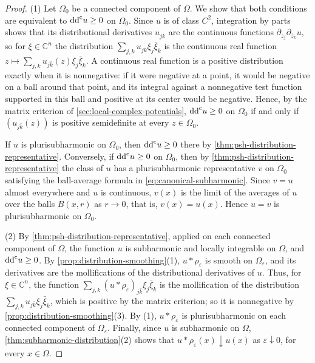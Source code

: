 \begin{proof}
(1) Let $\Omega_0$ be a connected component of $\Omega$. We show that both conditions are equivalent to $\mathrm{dd}^{\mathrm{c}} u\geq0$ on $\Omega_0$. Since $u$ is of class $C^2$, integration by parts shows that its distributional derivatives $u_{j\bar k}$ are the continuous functions $\partial_{z_j}\partial_{\bar z_k}u$, so for $\xi\in\mathbb{C}^n$ the distribution $\sum_{j,k}u_{j\bar k}\xi_j\bar\xi_k$ is the continuous real function $z\mapsto\sum_{j,k}u_{j\bar k}(z)\xi_j\bar\xi_k$. A continuous real function is a positive distribution exactly when it is nonnegative: if it were negative at a point, it would be negative on a ball around that point, and its integral against a nonnegative test function supported in this ball and positive at its center would be negative. Hence, by the matrix criterion of \cref{sec:local-complex-potentials}, $\mathrm{dd}^{\mathrm{c}} u\geq0$ on $\Omega_0$ if and only if $(u_{j\bar k}(z))$ is positive semidefinite at every $z\in\Omega_0$.

If $u$ is plurisubharmonic on $\Omega_0$, then $\mathrm{dd}^{\mathrm{c}} u\geq0$ there by \cref{thm:psh-distribution-representative}. Conversely, if $\mathrm{dd}^{\mathrm{c}} u\geq0$ on $\Omega_0$, then by \cref{thm:psh-distribution-representative} the class of $u$ has a plurisubharmonic representative $v$ on $\Omega_0$ satisfying the ball-average formula in \eqref{eq:canonical-subharmonic}. Since $v=u$ almost everywhere and $u$ is continuous, $v(x)$ is the limit of the averages of $u$ over the balls $B(x,r)$ as $r\to0$, that is, $v(x)=u(x)$. Hence $u=v$ is plurisubharmonic on $\Omega_0$.

(2) By \cref{thm:psh-distribution-representative}, applied on each connected component of $\Omega$, the function $u$ is subharmonic and locally integrable on $\Omega$, and $\mathrm{dd}^{\mathrm{c}} u\geq0$. By \cref{prop:distribution-smoothing}(1), $u*\rho_\varepsilon$ is smooth on $\Omega_\varepsilon$, and its derivatives are the mollifications of the distributional derivatives of $u$. Thus, for $\xi\in\mathbb{C}^n$, the function $\sum_{j,k}(u*\rho_\varepsilon)_{j\bar k}\xi_j\bar\xi_k$ is the mollification of the distribution $\sum_{j,k}u_{j\bar k}\xi_j\bar\xi_k$, which is positive by the matrix criterion; so it is nonnegative by \cref{prop:distribution-smoothing}(3). By (1), $u*\rho_\varepsilon$ is plurisubharmonic on each connected component of $\Omega_\varepsilon$. Finally, since $u$ is subharmonic on $\Omega$, \cref{thm:subharmonic-distribution}(2) shows that $u*\rho_\varepsilon(x)\downarrow u(x)$ as $\varepsilon\downarrow0$, for every $x\in\Omega$.
\end{proof}

